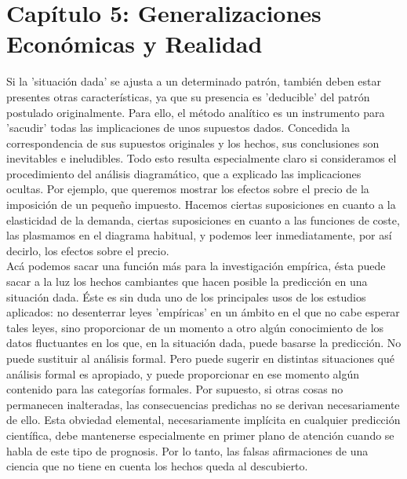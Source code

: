  \section{Capítulo 5: Generalizaciones Económicas y Realidad}

 Si la 'situación dada' se ajusta a un determinado patrón, también deben estar presentes otras características, ya que su presencia es 'deducible' del patrón postulado originalmente. Para ello, el método analítico es un instrumento para 'sacudir' todas las implicaciones de unos supuestos dados. Concedida la correspondencia de sus supuestos originales y los hechos, sus conclusiones son inevitables e ineludibles. Todo esto resulta especialmente claro si consideramos el procedimiento del análisis diagramático, que a explicado las implicaciones ocultas. Por ejemplo, que queremos mostrar los efectos sobre el precio de la imposición de un pequeño impuesto. Hacemos ciertas suposiciones en cuanto a la elasticidad de la demanda, ciertas suposiciones en cuanto a las funciones de coste, las plasmamos en el diagrama habitual, y podemos leer inmediatamente, por así decirlo, los efectos sobre el precio.\\
 Acá podemos sacar una función más para la investigación empírica, ésta puede sacar a la luz los hechos cambiantes que hacen posible la predicción en una situación dada. Éste es sin duda uno de los principales usos de los estudios aplicados: no desenterrar leyes 'empíricas' en un ámbito en el que no cabe esperar tales leyes, sino proporcionar de un momento a otro algún conocimiento de los datos fluctuantes en los que, en la situación dada, puede basarse la predicción. No puede sustituir al análisis formal. Pero puede sugerir en distintas situaciones qué análisis formal es apropiado, y puede proporcionar en ese momento algún contenido para las categorías formales. Por supuesto, si otras cosas no permanecen inalteradas, las consecuencias predichas no se derivan necesariamente de ello. Esta obviedad elemental, necesariamente implícita en cualquier predicción científica, debe mantenerse especialmente en primer plano de atención cuando se habla de este tipo de prognosis. Por lo tanto, las falsas afirmaciones de una ciencia que no tiene en cuenta los hechos queda al descubierto.

